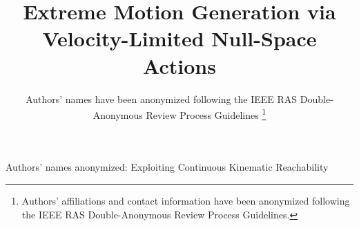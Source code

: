 \documentclass[journal, twoside]{IEEEtran}
\begin{document}
\title{Extreme Motion Generation via \\Velocity-Limited Null-Space Actions}


\author{Authors' names have been anonymized following the IEEE RAS Double-Anonymous Review Process Guidelines
\thanks{Authors' affiliations and contact information have been anonymized following the IEEE RAS Double-Anonymous Review Process Guidelines.}}
{Authors' names anonymized: Exploiting Continuous Kinematic Reachability}
\maketitle
\end{document}
